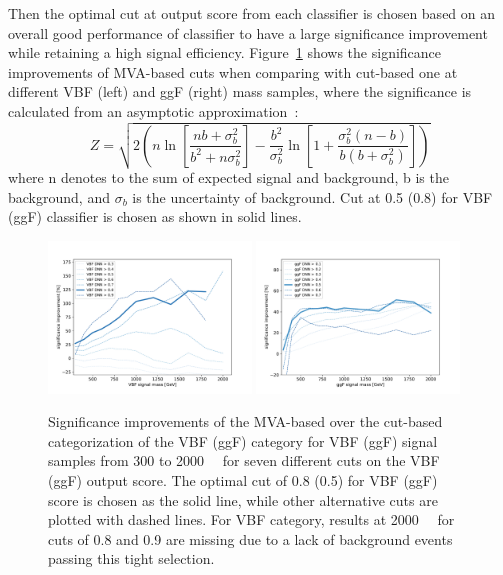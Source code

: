Then the optimal cut at output score from each classifier is chosen based on an overall good performance of classifier to have a large significance improvement while retaining a high signal efficiency.
Figure~\ref{fig:dnn_significance} shows the significance improvements of MVA-based cuts when comparing with cut-based one at different VBF (left) and ggF (right) mass samples,
where the significance is calculated from an asymptotic approximation~\cite{2008NIMPA.595..480C}:
\begin{equation}
Z = \sqrt{2\left(n\ln \left[ \frac{nb+\sigma_b^2}{b^2+n\sigma_b^2}\right]
        - \frac{b^2}{\sigma_b^2}\ln\left[1+\frac{\sigma_b^2(n-b)}{b(b+\sigma_b^2)}\right]\right)}
\end{equation}
where n denotes to the sum of expected signal and background, b is the background, and $\sigma_b$ is the uncertainty of background.
Cut at 0.5 (0.8) for VBF (ggF) classifier is chosen as shown in solid lines.

\begin{figure}[htbp]
        \includegraphics[width=0.48\textwidth]{figures/HMHZZ/selection/VBF_significance_improvement.pdf}
        \includegraphics[width=0.48\textwidth]{figures/HMHZZ/selection/ggf_significance_improvement.pdf}
        \centering
        \caption{Significance improvements of the MVA-based over the cut-based categorization of the VBF (ggF) category for VBF (ggF) signal samples from 300 to 2000~\gev~ for seven different cuts on the VBF (ggF) output score. 
	The optimal cut of 0.8 (0.5) for VBF (ggF) score is chosen as the solid line, while other alternative cuts are plotted with dashed lines. 
	For VBF category, results at 2000~\gev~ for cuts of 0.8 and 0.9 are missing due to a lack of background events passing this tight selection.}
        \label{fig:dnn_significance}
\end{figure}

